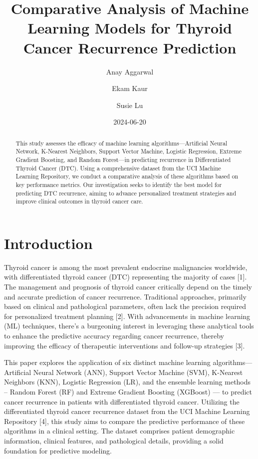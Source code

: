 \documentclass[
  letterpaper,
  DIV=11,
  numbers=noendperiod]{scrartcl}
\title{Comparative Analysis of Machine Learning Models for Thyroid
Cancer Recurrence Prediction}
\author{Anay Aggarwal \and Ekam Kaur \and Susie Lu}
\date{2024-06-20}
\begin{document}
\maketitle
\begin{abstract}
This study assesses the efficacy of machine learning
algorithms---Artificial Neural Network, K-Nearest Neighbors, Support
Vector Machine, Logistic Regression, Extreme Gradient Boosting, and
Random Forest---in predicting recurrence in Differentiated Thyroid
Cancer (DTC). Using a comprehensive dataset from the UCI Machine
Learning Repository, we conduct a comparative analysis of these
algorithms based on key performance metrics. Our investigation seeks to
identify the best model for predicting DTC recurrence, aiming to advance
personalized treatment strategies and improve clinical outcomes in
thyroid cancer care.
\end{abstract}

\section{Introduction}\label{introduction}

Thyroid cancer is among the most prevalent endocrine malignancies
worldwide, with differentiated thyroid cancer (DTC) representing the
majority of cases {[}1{]}. The management and prognosis of thyroid
cancer critically depend on the timely and accurate prediction of cancer
recurrence. Traditional approaches, primarily based on clinical and
pathological parameters, often lack the precision required for
personalized treatment planning {[}2{]}. With advancements in machine
learning (ML) techniques, there's a burgeoning interest in leveraging
these analytical tools to enhance the predictive accuracy regarding
cancer recurrence, thereby improving the efficacy of therapeutic
interventions and follow-up strategies {[}3{]}.

This paper explores the application of six distinct machine learning
algorithms---Artificial Neural Network (ANN), Support Vector Machine
(SVM), K-Nearest Neighbors (KNN), Logistic Regression (LR), and the
ensemble learning methods -- Random Forest (RF) and Extreme Gradient
Boosting (XGBoost) --- to predict cancer recurrence in patients with
differentiated thyroid cancer. Utilizing the differentiated thyroid
cancer recurrence dataset from the UCI Machine Learning Repository
{[}4{]}, this study aims to compare the predictive performance of these
algorithms in a clinical setting. The dataset comprises patient
demographic information, clinical features, and pathological details,
providing a solid foundation for predictive modeling.
\end{document}
